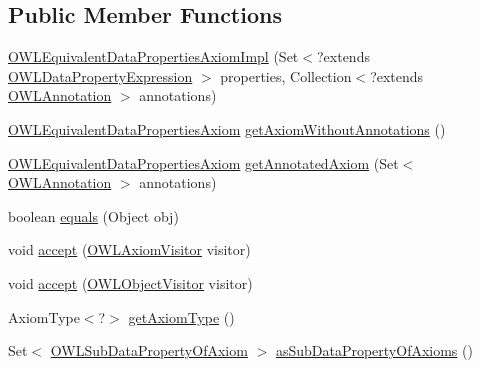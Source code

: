 \subsection*{Public Member Functions}
\begin{DoxyCompactItemize}
\item 
\hyperlink{classuk_1_1ac_1_1manchester_1_1cs_1_1owl_1_1owlapi_1_1_o_w_l_equivalent_data_properties_axiom_impl_adab6f6c10a9ab627f41180623efe6b1a}{O\-W\-L\-Equivalent\-Data\-Properties\-Axiom\-Impl} (Set$<$?extends \hyperlink{interfaceorg_1_1semanticweb_1_1owlapi_1_1model_1_1_o_w_l_data_property_expression}{O\-W\-L\-Data\-Property\-Expression} $>$ properties, Collection$<$?extends \hyperlink{interfaceorg_1_1semanticweb_1_1owlapi_1_1model_1_1_o_w_l_annotation}{O\-W\-L\-Annotation} $>$ annotations)
\item 
\hyperlink{interfaceorg_1_1semanticweb_1_1owlapi_1_1model_1_1_o_w_l_equivalent_data_properties_axiom}{O\-W\-L\-Equivalent\-Data\-Properties\-Axiom} \hyperlink{classuk_1_1ac_1_1manchester_1_1cs_1_1owl_1_1owlapi_1_1_o_w_l_equivalent_data_properties_axiom_impl_a13c531f7afa3e707604d2debe5d4cbb0}{get\-Axiom\-Without\-Annotations} ()
\item 
\hyperlink{interfaceorg_1_1semanticweb_1_1owlapi_1_1model_1_1_o_w_l_equivalent_data_properties_axiom}{O\-W\-L\-Equivalent\-Data\-Properties\-Axiom} \hyperlink{classuk_1_1ac_1_1manchester_1_1cs_1_1owl_1_1owlapi_1_1_o_w_l_equivalent_data_properties_axiom_impl_a69c33f314d1a649e40e309dbfbcbbfd7}{get\-Annotated\-Axiom} (Set$<$ \hyperlink{interfaceorg_1_1semanticweb_1_1owlapi_1_1model_1_1_o_w_l_annotation}{O\-W\-L\-Annotation} $>$ annotations)
\item 
boolean \hyperlink{classuk_1_1ac_1_1manchester_1_1cs_1_1owl_1_1owlapi_1_1_o_w_l_equivalent_data_properties_axiom_impl_ab527e406a6d8daaf189483f9c929e9dc}{equals} (Object obj)
\item 
void \hyperlink{classuk_1_1ac_1_1manchester_1_1cs_1_1owl_1_1owlapi_1_1_o_w_l_equivalent_data_properties_axiom_impl_ae130fa9777e3104dbae6dbe1db290ae2}{accept} (\hyperlink{interfaceorg_1_1semanticweb_1_1owlapi_1_1model_1_1_o_w_l_axiom_visitor}{O\-W\-L\-Axiom\-Visitor} visitor)
\item 
void \hyperlink{classuk_1_1ac_1_1manchester_1_1cs_1_1owl_1_1owlapi_1_1_o_w_l_equivalent_data_properties_axiom_impl_ae89209392e8a51726ee1ea8b47526a8e}{accept} (\hyperlink{interfaceorg_1_1semanticweb_1_1owlapi_1_1model_1_1_o_w_l_object_visitor}{O\-W\-L\-Object\-Visitor} visitor)
\item 
Axiom\-Type$<$?$>$ \hyperlink{classuk_1_1ac_1_1manchester_1_1cs_1_1owl_1_1owlapi_1_1_o_w_l_equivalent_data_properties_axiom_impl_a47a8fe48b05ff607b02a5a30de8b4ba8}{get\-Axiom\-Type} ()
\item 
Set$<$ \hyperlink{interfaceorg_1_1semanticweb_1_1owlapi_1_1model_1_1_o_w_l_sub_data_property_of_axiom}{O\-W\-L\-Sub\-Data\-Property\-Of\-Axiom} $>$ \hyperlink{classuk_1_1ac_1_1manchester_1_1cs_1_1owl_1_1owlapi_1_1_o_w_l_equivalent_data_properties_axiom_impl_acea987044a6f101f9c150d0f32127797}{as\-Sub\-Data\-Property\-Of\-Axioms} ()
\end{DoxyCompactItemize}
